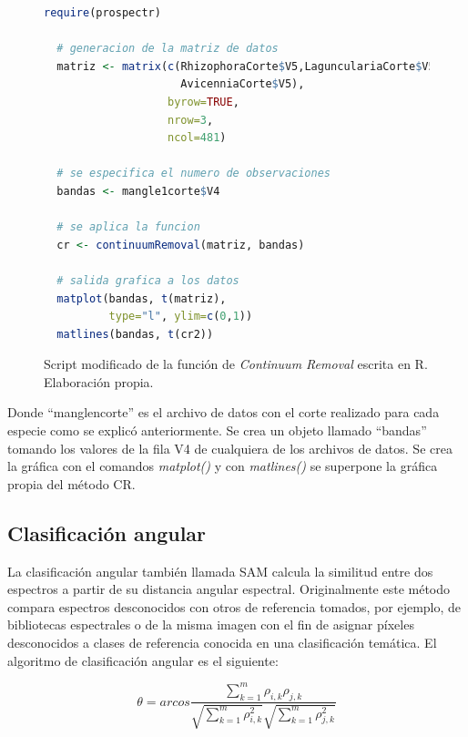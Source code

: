 \begin{figure}[ht]
	\centering
	\begin{lstlisting}[language = R]
  require(prospectr)
  
  # generacion de la matriz de datos
  matriz <- matrix(c(RhizophoraCorte$V5,LagunculariaCorte$V5,
                     AvicenniaCorte$V5),
                   byrow=TRUE,
                   nrow=3,
                   ncol=481)
  
  # se especifica el numero de observaciones                 
  bandas <- mangle1corte$V4
  
  # se aplica la funcion
  cr <- continuumRemoval(matriz, bandas)
  
  # salida grafica a los datos
  matplot(bandas, t(matriz),
          type="l", ylim=c(0,1))
  matlines(bandas, t(cr2))
	\end{lstlisting}
	\caption[Función modificada de \textit{Continuum Removal}]{Script modificado de la función de \textit{Continuum Removal} escrita en R. Elaboración propia.}
	\label{fig:CRmodificado}
\end{figure}	

Donde ``manglencorte'' es el archivo de datos con el corte realizado para cada especie como se explicó anteriormente. Se crea un objeto llamado ``bandas'' tomando los valores de la fila V4 de cualquiera de los archivos de datos. Se crea la gráfica con el comandos \textit{matplot()} y con \textit{matlines()} se superpone la gráfica propia del método \ac{CR}.\Sep

\subsection{Clasificación angular}
La clasificación angular también llamada \ac{SAM} calcula la similitud entre dos espectros a partir de su distancia angular espectral. Originalmente este método compara espectros desconocidos con otros de referencia tomados, por ejemplo, de bibliotecas espectrales o de la misma imagen \citep{girouard2004validated} con el fin de asignar píxeles desconocidos a clases de referencia conocida en una clasificación temática. El algoritmo de clasificación angular es el siguiente:

\begin{equation} \label{eq:angular}
	\theta = arcos \frac{\sum_{k=1}^{m} \rho_{i,k} \rho_{j,k}}{\sqrt{\sum_{k=1}^{m} \rho_{i,k}^{2}} \sqrt{\sum_{k=1}^{m} \rho_{j,k}^{2}}}
\end{equation}\Sep

